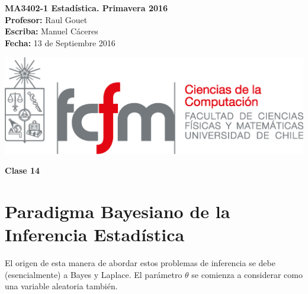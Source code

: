 \documentclass[10pt]{article}
\theoremstyle{plain}
\theoremstyle{definition}
\newcommand{\catnum}{14} %
\newcommand{\fecha}{13 de Septiembre 2016 }
\begin{document}
\vspace*{-1.2 cm}
\begin{minipage}{0.6\textwidth}
\begin{flushleft}
\hspace*{-0.5cm}\textbf{MA3402-1 Estadística. Primavera 2016}\\
\hspace*{-0.5cm}\textbf{Profesor:} Raul Gouet\\
\hspace*{-0.5cm}\textbf{Escriba:} Manuel Cáceres\\
\hspace*{-0.5cm}\textbf{Fecha:} \fecha
\end{flushleft}
\end{minipage}
\begin{minipage}{0.36\textwidth}
\begin{flushright}
\includegraphics[scale=0.3]{imagenes/fcfm_dcc}
\end{flushright}
\end{minipage}
\bigskip

\begin{center}
\LARGE\textbf{Clase \catnum}
\end{center}
\section{Paradigma Bayesiano de la Inferencia Estadística}
El origen de esta manera de abordar estos problemas de inferencia se debe (esencialmente) a Bayes y Laplace. El parámetro $\theta$ se comienza a considerar como una variable aleatoria también.
\end{document}
